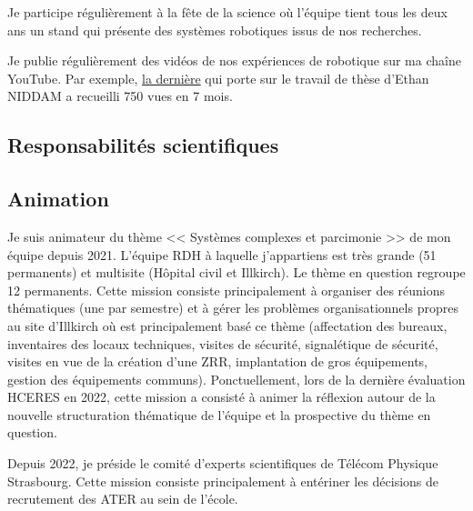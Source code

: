 \documentclass[a4paper,12pt]{article}
\begin{document}
Je participe régulièrement à la fête de la science où l'équipe tient tous les deux ans un stand qui présente des systèmes robotiques issus de nos recherches.

Je publie régulièrement des vidéos de nos expériences de robotique sur ma chaîne YouTube. Par exemple, \href{https://youtu.be/fZkru3tZsYo}{la dernière} qui porte sur le travail de thèse d'Ethan NIDDAM a 
 recueilli 750 vues en 7 mois.

\subsection{Responsabilités scientifiques}



\subsection{Animation}

Je suis animateur du thème << Systèmes complexes et parcimonie >> de mon équipe depuis 2021. L’équipe RDH à laquelle j’appartiens est très grande (51 permanents) et multisite (Hôpital civil et Illkirch). Le thème en question regroupe 12 permanents. Cette mission consiste principalement à organiser des réunions thématiques (une par semestre) et à gérer les problèmes organisationnels propres au site d’Illkirch où est principalement basé ce thème (affectation des bureaux, inventaires des locaux techniques, visites de sécurité, signalétique de sécurité, visites en vue de la création d’une ZRR, implantation de gros équipements, gestion des équipements communs). Ponctuellement, lors de la dernière évaluation HCERES en 2022, cette mission a consisté à animer la réflexion autour de la nouvelle structuration thématique de l’équipe et la prospective du thème en question.

Depuis 2022, je préside le comité d’experts scientifiques de Télécom Physique Strasbourg. Cette mission consiste principalement à entériner les décisions de recrutement des ATER au sein de l’école.
\end{document}
